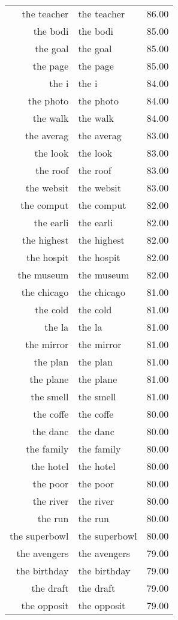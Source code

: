 \begin{table}[ht]
\begin{tabular}{rlr}
  the teacher & the teacher & 86.00 \\ 
  the bodi & the bodi & 85.00 \\ 
  the goal & the goal & 85.00 \\ 
  the page & the page & 85.00 \\ 
  the i & the i & 84.00 \\ 
  the photo & the photo & 84.00 \\ 
  the walk & the walk & 84.00 \\ 
  the averag & the averag & 83.00 \\ 
  the look & the look & 83.00 \\ 
  the roof & the roof & 83.00 \\ 
  the websit & the websit & 83.00 \\ 
  the comput & the comput & 82.00 \\ 
  the earli & the earli & 82.00 \\ 
  the highest & the highest & 82.00 \\ 
  the hospit & the hospit & 82.00 \\ 
  the museum & the museum & 82.00 \\ 
  the chicago & the chicago & 81.00 \\ 
  the cold & the cold & 81.00 \\ 
  the la & the la & 81.00 \\ 
  the mirror & the mirror & 81.00 \\ 
  the plan & the plan & 81.00 \\ 
  the plane & the plane & 81.00 \\ 
  the smell & the smell & 81.00 \\ 
  the coffe & the coffe & 80.00 \\ 
  the danc & the danc & 80.00 \\ 
  the family & the family & 80.00 \\ 
  the hotel & the hotel & 80.00 \\ 
  the poor & the poor & 80.00 \\ 
  the river & the river & 80.00 \\ 
  the run & the run & 80.00 \\ 
  the superbowl & the superbowl & 80.00 \\ 
  the avengers & the avengers & 79.00 \\ 
  the birthday & the birthday & 79.00 \\ 
  the draft & the draft & 79.00 \\ 
  the opposit & the opposit & 79.00 \\ 

\end{tabular}
\end{table}
